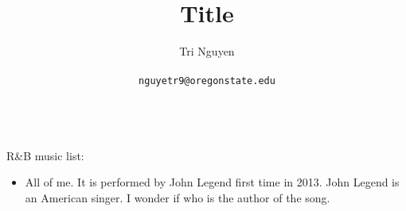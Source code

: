 \documentclass[11pt,a4paper]{article}
\title{Title}
\author{	Tri Nguyen \\\\
        \texttt{nguyetr9@oregonstate.edu} \\\\
        }
\begin{document}
\maketitle

R\&B music list:
\begin{itemize}
    \item All of me. It is performed by John Legend first time in 2013. John Legend is an American singer.
        I wonder if who is the author of the song.
\end{itemize}
\end{document}
